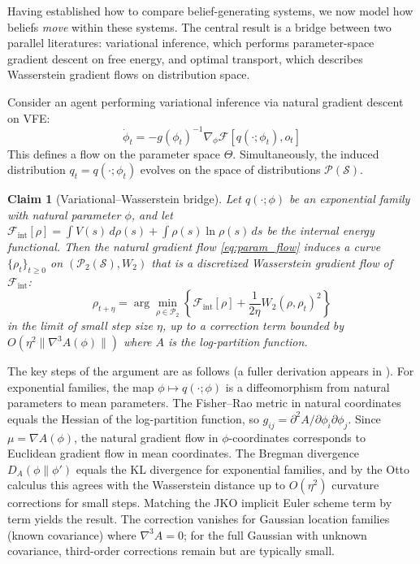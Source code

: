 \documentclass[11pt,a4paper]{article}
\newtheorem{claim}{Claim}[section]
\theoremstyle{definition}
\newcommand{\VFE}{\mathcal{F}}
\newcommand{\cS}{\mathcal{S}}
\newcommand{\cP}{\mathcal{P}}
\newcommand{\Wass}{W_2}
\begin{document}
Having established how to compare belief-generating systems, we now model how beliefs \emph{move} within these systems. The central result is a bridge between two parallel literatures: variational inference, which performs parameter-space gradient descent on free energy, and optimal transport, which describes Wasserstein gradient flows on distribution space.

Consider an agent performing variational inference via natural gradient descent on VFE:
\begin{equation}
  \dot{\phi}_t = -g(\phi_t)^{-1} \nabla_\phi \VFE[q(\cdot; \phi_t), o_t]
  \label{eq:param_flow}
\end{equation}
This defines a flow on the parameter space $\Theta$. Simultaneously, the induced distribution $q_t = q(\cdot; \phi_t)$ evolves on the space of distributions $\cP(\cS)$.

\begin{claim}[Variational--Wasserstein bridge]
\label{claim:var_wass}
Let $q(\cdot; \phi)$ be an exponential family with natural parameter $\phi$, and let $\VFE_{\mathrm{int}}[\rho] = \int V(s) \, d\rho(s) + \int \rho(s) \ln \rho(s) \, ds$ be the internal energy functional. Then the natural gradient flow \eqref{eq:param_flow} induces a curve $\{\rho_t\}_{t \geq 0}$ on $(\cP_2(\cS), \Wass)$ that is a discretized Wasserstein gradient flow of $\VFE_{\mathrm{int}}$:
\begin{equation}
  \rho_{t+\eta} = \arg\min_{\rho \in \cP_2} \left\{\VFE_{\mathrm{int}}[\rho] + \frac{1}{2\eta} \Wass(\rho, \rho_t)^2\right\}
  \label{eq:jko_step}
\end{equation}
in the limit of small step size $\eta$, up to a correction term bounded by $O(\eta^2 \|\nabla^3 A(\phi)\|)$ where $A$ is the log-partition function.
\end{claim}

The key steps of the argument are as follows (a fuller derivation appears in ). For exponential families, the map $\phi \mapsto q(\cdot; \phi)$ is a diffeomorphism from natural parameters to mean parameters. The Fisher--Rao metric in natural coordinates equals the Hessian of the log-partition function, so $g_{ij} = \partial^2 A / \partial \phi_i \partial \phi_j$. Since $\mu = \nabla A(\phi)$, the natural gradient flow in $\phi$-coordinates corresponds to Euclidean gradient flow in mean coordinates. The Bregman divergence $D_A(\phi \| \phi')$ equals the KL divergence for exponential families, and by the Otto calculus \citep{otto2001geometry} this agrees with the Wasserstein distance up to $O(\eta^2)$ curvature corrections for small steps. Matching the JKO implicit Euler scheme term by term yields the result. The correction vanishes for Gaussian location families (known covariance) where $\nabla^3 A = 0$; for the full Gaussian with unknown covariance, third-order corrections remain but are typically small.
\end{document}
